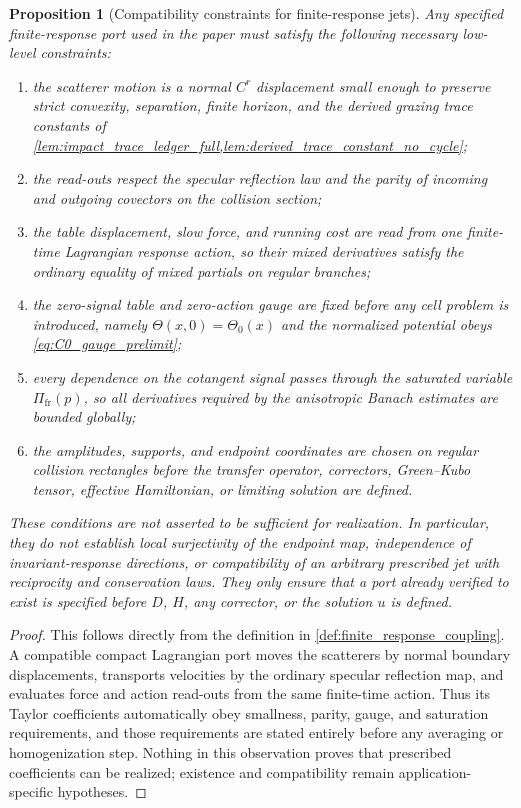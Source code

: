 \documentclass[12pt, letterpaper]{amsart}
\newcommand{\Pifr}{\Pi_{\mathrm{fr}}}
\theoremstyle{plain}
\newtheorem{proposition}[theorem]{Proposition}
\theoremstyle{definition}
\theoremstyle{remark}
\begin{document}
\begin{proposition}[Compatibility constraints for finite-response jets]
\label{prop:finite_response_constraints}
Any specified finite-response port used in the paper must satisfy the following
necessary low-level constraints:
\begin{enumerate}[label=\textup{(\roman*)}, wide, labelindent=0pt]
    \item the scatterer motion is a normal $C^r$ displacement small enough to
    preserve strict convexity, separation, finite horizon, and the derived grazing
    trace constants of \cref{lem:impact_trace_ledger_full,lem:derived_trace_constant_no_cycle};
    \item the read-outs respect the specular reflection law and the parity of
    incoming and outgoing covectors on the collision section;
    \item the table displacement, slow force, and running cost are read from one
    finite-time Lagrangian response action, so their mixed derivatives satisfy
    the ordinary equality of mixed partials on regular branches;
    \item the zero-signal table and zero-action gauge are fixed before any cell
    problem is introduced, namely $\Theta(x,0)=\Theta_0(x)$ and the normalized
    potential obeys \eqref{eq:C0_gauge_prelimit};
    \item every dependence on the cotangent signal passes through the saturated
    variable $\Pifr(p)$, so all derivatives required by the anisotropic Banach
    estimates are bounded globally;
    \item the amplitudes, supports, and endpoint coordinates are chosen on
    regular collision rectangles before the transfer operator, correctors,
    Green--Kubo tensor, effective Hamiltonian, or limiting solution are defined.
\end{enumerate}
These conditions are not asserted to be sufficient for realization.  In
particular, they do not establish local surjectivity of the endpoint map,
independence of invariant-response directions, or compatibility of an arbitrary
prescribed jet with reciprocity and conservation laws.  They only ensure that a
port already verified to exist is specified before $D$, $H$, any corrector, or
the solution $u$ is defined.
\end{proposition}

\begin{proof}
This follows directly from the definition in
\cref{def:finite_response_coupling}.  A compatible compact Lagrangian port moves the
scatterers by normal boundary displacements, transports velocities by the
ordinary specular reflection map, and evaluates force and action read-outs from
the same finite-time action.  Thus its Taylor coefficients automatically obey
smallness, parity, gauge, and saturation requirements, and those requirements
are stated entirely before any averaging or homogenization step.
Nothing in this observation proves that prescribed coefficients can be realized;
existence and compatibility remain application-specific hypotheses.
\end{proof}
\end{document}
